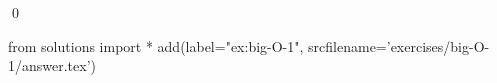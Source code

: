 
\begin{ex} 
  \label{ex:big-O-1}
  
  \qed
\end{ex} 
\begin{python0}
from solutions import *
add(label="ex:big-O-1",
    srcfilename='exercises/big-O-1/answer.tex') 
\end{python0}
